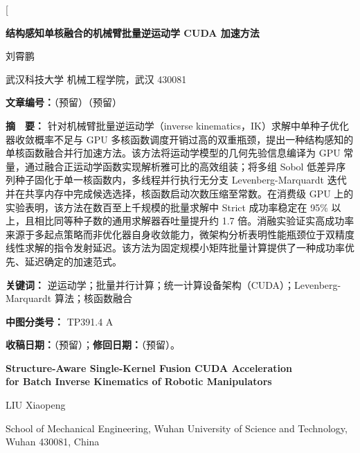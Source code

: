 \documentclass[twocolumn,a4paper,10pt]{ctexart}
\begin{document}
\twocolumn[%
{\centering
{\LARGE\bfseries 结构感知单核融合的机械臂批量逆运动学 CUDA 加速方法}\par\vspace{4mm}
{\large 刘霄鹏}\par\vspace{1mm}
{\small 武汉科技大学 机械工程学院，武汉 430081}\par\vspace{3mm}
{\small\bfseries 文章编号：}（预留）（预留）\par\vspace{2mm}
\begin{minipage}{0.91\textwidth}\small
{\bfseries 摘　要：} 针对机械臂批量逆运动学（inverse kinematics，IK）求解中单种子优化器收敛概率不足与 GPU 多核函数调度开销过高的双重瓶颈，提出一种结构感知的单核函数融合并行加速方法。该方法将运动学模型的几何先验信息编译为 GPU 常量，通过融合正运动学函数实现解析雅可比的高效组装；将多组 Sobol 低差异序列种子固化于单一核函数内，多线程并行执行无分支 Levenberg-Marquardt 迭代并在共享内存中完成候选选择，核函数启动次数压缩至常数。在消费级 GPU 上的实验表明，该方法在数百至上千规模的批量求解中 Strict 成功率稳定在 95\% 以上，且相比同等种子数的通用求解器吞吐量提升约 1.7 倍。消融实验证实高成功率来源于多起点策略而非优化器自身收敛能力，微架构分析表明性能瓶颈位于双精度线性求解的指令发射延迟。该方法为固定规模小矩阵批量计算提供了一种成功率优先、延迟确定的加速范式。\par\vspace{2mm}
{\bfseries 关键词：} 逆运动学；批量并行计算；统一计算设备架构（CUDA）；Levenberg-Marquardt 算法；核函数融合\par
{\bfseries 中图分类号：} TP391.4 A\par
{\bfseries 收稿日期：}（预留）；{\bfseries 修回日期：}（预留）。\par
\end{minipage}\par\vspace{4mm}
\begin{minipage}{0.91\textwidth}\small
{\centering
{\bfseries\large Structure-Aware Single-Kernel Fusion CUDA Acceleration\\ for Batch Inverse Kinematics of Robotic Manipulators}\par\vspace{2mm}
{\small LIU Xiaopeng}\par\vspace{1mm}
{\small School of Mechanical Engineering, Wuhan University of Science and Technology, Wuhan 430081, China}\par\vspace{3mm}
}
\end{minipage}}
\end{document}
